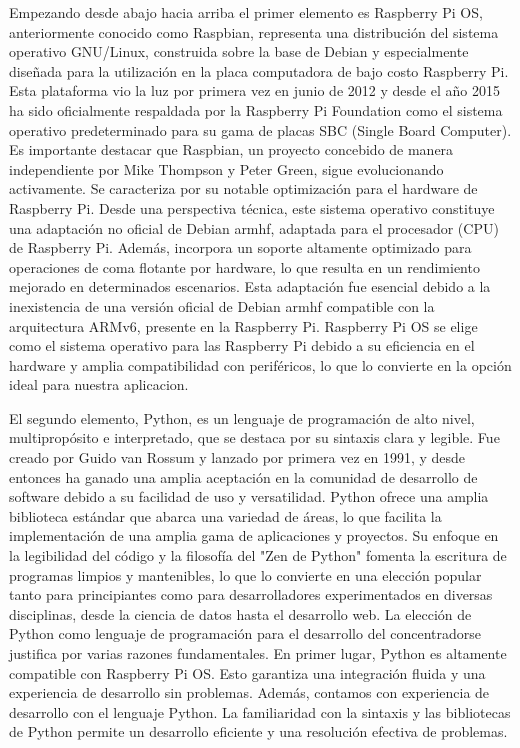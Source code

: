Empezando desde abajo hacia arriba el primer elemento es Raspberry Pi OS, anteriormente conocido como Raspbian, representa una distribución del sistema operativo GNU/Linux, construida sobre la base de Debian y especialmente diseñada para la utilización en la placa computadora de bajo costo Raspberry Pi. Esta plataforma vio la luz por primera vez en junio de 2012 y desde el año 2015 ha sido oficialmente respaldada por la Raspberry Pi Foundation como el sistema operativo predeterminado para su gama de placas SBC (Single Board Computer).
Es importante destacar que Raspbian, un proyecto concebido de manera independiente por Mike Thompson y Peter Green, sigue evolucionando activamente. Se caracteriza por su notable optimización para el hardware de Raspberry Pi. Desde una perspectiva técnica, este sistema operativo constituye una adaptación no oficial de Debian armhf, adaptada para el procesador (CPU) de Raspberry Pi. Además, incorpora un soporte altamente optimizado para operaciones de coma flotante por hardware, lo que resulta en un rendimiento mejorado en determinados escenarios. Esta adaptación fue esencial debido a la inexistencia de una versión oficial de Debian armhf compatible con la arquitectura ARMv6, presente en la Raspberry Pi.
Raspberry Pi OS se elige como el sistema operativo para las Raspberry Pi debido a su eficiencia en el hardware y amplia compatibilidad con periféricos, lo que lo convierte en la opción ideal para nuestra aplicacion.

El segundo elemento, Python, es un lenguaje de programación de alto nivel, multipropósito e interpretado, que se destaca por su sintaxis clara y legible. Fue creado por Guido van Rossum y lanzado por primera vez en 1991, y desde entonces ha ganado una amplia aceptación en la comunidad de desarrollo de software debido a su facilidad de uso y versatilidad. Python ofrece una amplia biblioteca estándar que abarca una variedad de áreas, lo que facilita la implementación de una amplia gama de aplicaciones y proyectos. Su enfoque en la legibilidad del código y la filosofía del "Zen de Python" fomenta la escritura de programas limpios y mantenibles, lo que lo convierte en una elección popular tanto para principiantes como para desarrolladores experimentados en diversas disciplinas, desde la ciencia de datos hasta el desarrollo web.
La elección de Python como lenguaje de programación para el desarrollo del concentradorse justifica por varias razones fundamentales. En primer lugar, Python es altamente compatible con Raspberry Pi OS. Esto garantiza una integración fluida y una experiencia de desarrollo sin problemas.
Además, contamos con experiencia de desarrollo con el lenguaje Python. La familiaridad con la sintaxis y las bibliotecas de Python permite un desarrollo eficiente y una resolución efectiva de problemas.


